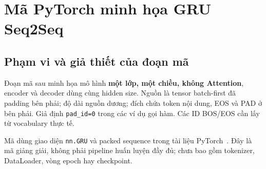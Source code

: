 \documentclass[11pt,a4paper]{article}
\numberwithin{equation}{section}
\begin{document}
\clearpage
\appendix
\section{Mã PyTorch minh họa GRU Seq2Seq}
\subsection{Phạm vi và giả thiết của đoạn mã}
Đoạn mã sau minh họa mô hình \textbf{một lớp, một chiều, không Attention}, encoder và decoder dùng cùng hidden size. Nguồn là tensor batch-first đã padding bên phải; độ dài nguồn dương; đích chứa token nội dung, EOS và PAD ở bên phải. Giả định \texttt{pad\_id=0} trong các ví dụ gọi hàm. Các ID BOS/EOS cần lấy từ vocabulary thực tế.

Mã dùng giao diện \texttt{nn.GRU} và packed sequence trong tài liệu PyTorch~\cite{torchgru,torchpack}. Đây là mã giảng giải, không phải pipeline huấn luyện đầy đủ; chưa bao gồm tokenizer, DataLoader, vòng epoch hay checkpoint.
\end{document}
